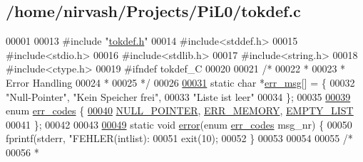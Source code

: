 \hypertarget{tokdef_8c_source}{\subsection{/home/nirvash/\-Projects/\-Pi\-L0/tokdef.c}
}

\begin{DoxyCode}
00001 
00013 \textcolor{preprocessor}{#include "\hyperlink{tokdef_8h}{tokdef.h}"}
00014 \textcolor{preprocessor}{#include<stddef.h>}
00015 \textcolor{preprocessor}{#include<stdio.h>}
00016 \textcolor{preprocessor}{#include<stdlib.h>}
00017 \textcolor{preprocessor}{#include<string.h>}
00018 \textcolor{preprocessor}{#include<ctype.h>}
00019 \textcolor{preprocessor}{#ifndef tokdef\_C}
00020 \textcolor{preprocessor}{}
00021 \textcolor{comment}{/*}
00022 \textcolor{comment}{ * }
00023 \textcolor{comment}{ * Error Handling}
00024 \textcolor{comment}{ * }
00025 \textcolor{comment}{*/}
00026 
\hypertarget{tokdef_8c_source_l00031}{}\hyperlink{tokdef_8c_a404a364e08451a6c51c14b31e237453c}{00031} \textcolor{keyword}{static} \textcolor{keywordtype}{char} *\hyperlink{tokdef_8c_a404a364e08451a6c51c14b31e237453c}{err_msg}[] = \{
00032     \textcolor{stringliteral}{"Null-Pointer"}, \textcolor{stringliteral}{"Kein Speicher frei"},
00033     \textcolor{stringliteral}{"Liste ist leer"}
00034   \}; 
00035   
\hypertarget{tokdef_8c_source_l00039}{}\hyperlink{tokdef_8c_ad7109e2dccd18353c3bdd5f55ad94b55}{00039} \textcolor{keyword}{enum} \hyperlink{tokdef_8c_ad7109e2dccd18353c3bdd5f55ad94b55}{err_codes} \{
\hypertarget{tokdef_8c_source_l00040}{}\hyperlink{tokdef_8c_ad7109e2dccd18353c3bdd5f55ad94b55a4fb873dc451927ef6a70af3a1e7f08bd}{00040}     \hyperlink{tokdef_8c_ad7109e2dccd18353c3bdd5f55ad94b55a4fb873dc451927ef6a70af3a1e7f08bd}{NULL_POINTER}, \hyperlink{tokdef_8c_ad7109e2dccd18353c3bdd5f55ad94b55afb88c5fa6e7d51074ec36bd4578e03a0}{ERR_MEMORY}, \hyperlink{tokdef_8c_ad7109e2dccd18353c3bdd5f55ad94b55a60202b752d64be3e9634f160ce5dca7d}{EMPTY_LIST}
00041   \};
00042   
00043 
\hypertarget{tokdef_8c_source_l00049}{}\hyperlink{tokdef_8c_a8b4b6428a8bf1450cf23b6032dec56cf}{00049} \textcolor{keyword}{static} \textcolor{keywordtype}{void} \hyperlink{tokdef_8c_a8b4b6428a8bf1450cf23b6032dec56cf}{error}(\textcolor{keyword}{enum} \hyperlink{tokdef_8c_ad7109e2dccd18353c3bdd5f55ad94b55}{err_codes} msg\_nr) \{
00050   fprintf(stderr, \textcolor{stringliteral}{"FEHLER(intlist): %
00051   exit(10);
00052 \}
00053 
00054 
00055 \textcolor{comment}{/*}
00056 \textcolor{comment}{ * }
}
\end{DoxyCode}
